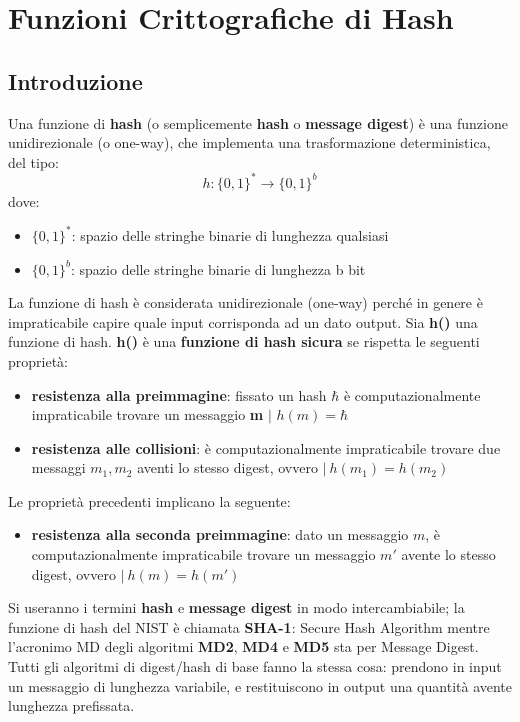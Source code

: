 \chapter{Funzioni Crittografiche di Hash} \label{ch:hash}
\section{Introduzione}
Una funzione di \textbf{hash} (o semplicemente \textbf{hash} o \textbf{message digest}) è una funzione unidirezionale (o one-way), che implementa una trasformazione deterministica, del tipo: 
\begin{equation}
h: \{0, 1\}^{*} \rightarrow \{0, 1\}^{b}
\end{equation}
dove:
\begin{itemize}
	\item $\{0, 1\}^{*}$: spazio delle stringhe binarie di lunghezza qualsiasi
	\item $\{0, 1\}^{b}$: spazio delle stringhe binarie di lunghezza b bit
\end{itemize}

La funzione di hash è considerata unidirezionale (one-way) perché in genere è impraticabile capire quale input corrisponda ad un dato output. 
\newline \newline
Sia \textbf{h()} una funzione di hash. \textbf{h()} è una \textbf{funzione di hash sicura} se rispetta le seguenti proprietà:

\begin{itemize}
	\item \textbf{resistenza alla preimmagine}: fissato un hash $\hbar$ è computazionalmente impraticabile trovare un messaggio \textbf{m} $\mid$ $h(m) = \hbar$
	\item \textbf{resistenza alle collisioni}: è computazionalmente	impraticabile trovare due messaggi $m_1,m_2$ aventi lo stesso digest, ovvero $\mid \: h(m_1) = h(m_2)$ 
\end{itemize}
Le proprietà precedenti implicano la seguente:
\begin{itemize}
	\item \textbf{resistenza alla seconda preimmagine}: dato un messaggio $m$, è computazionalmente impraticabile trovare un	messaggio $m'$ avente lo stesso digest, ovvero $ \mid \: h(m) = h(m')$
\end{itemize}

Si useranno i termini \textbf{hash} e \textbf{message digest} in modo intercambiabile; la funzione di hash del NIST è chiamata \textbf{SHA-1}: Secure Hash Algorithm mentre l'acronimo MD degli algoritmi \textbf{MD2}, \textbf{MD4} e \textbf{MD5} sta per Message Digest. Tutti gli algoritmi di digest/hash di base fanno la stessa cosa: prendono in input un messaggio di lunghezza variabile, e restituiscono in output una quantità avente lunghezza prefissata. \newline \newline

